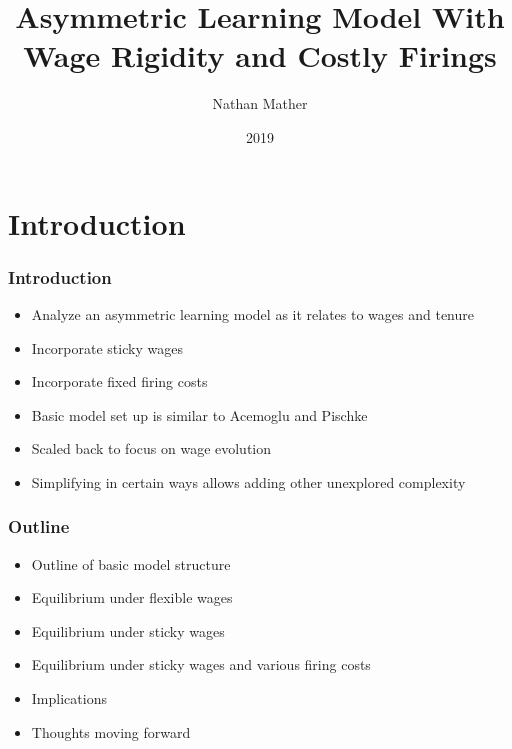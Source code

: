 \documentclass{beamer}
\title{Asymmetric Learning Model With Wage Rigidity and Costly Firings}
\author{Nathan Mather}
\institute{University of Michigan}
\date{2019}
\begin{document}
	

	
	\frame{\titlepage}
	
\section{Introduction}

\begin{frame}
	\frametitle{Introduction}
	\begin{itemize}
		\setlength{\itemsep}{3mm}
		\item Analyze an asymmetric learning model as it relates to wages and tenure 
		\item Incorporate sticky wages 
		\item Incorporate fixed firing costs 
		\item Basic model set up is similar to Acemoglu and Pischke
		\item Scaled back to focus on wage evolution 
		\item Simplifying in certain ways allows adding other unexplored complexity 
	\end{itemize}
\end{frame}


\begin{frame}
\frametitle{Outline}
\begin{itemize}
	\setlength{\itemsep}{3mm}
	\item Outline of basic model structure 
	\item Equilibrium under flexible wages 
	\item Equilibrium under sticky wages
	\item Equilibrium under sticky wages and various firing costs
	\item Implications 
	\item Thoughts moving forward 
\end{itemize}
\end{frame}
\end{document}
